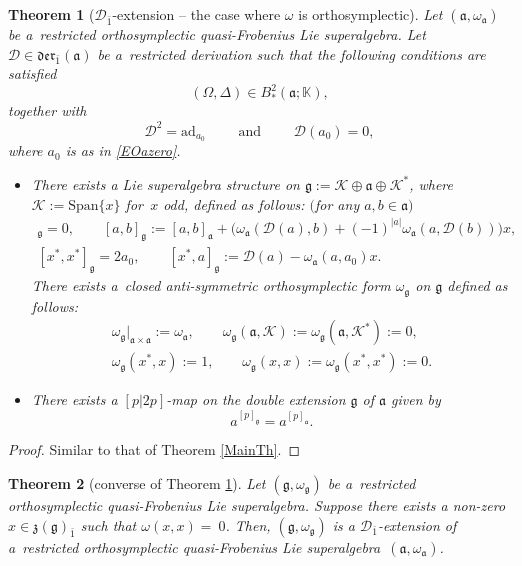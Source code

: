 \documentclass[10pt,a4paper]{amsart}
\numberwithin{equation}{section}
\newtheorem{Theorem}{Theorem}[section]
\begin{document}
\begin{Theorem}[${\mathscr D}_{\bar 1}$-extension -- the case where $\omega$ is orthosymplectic] \label{MainThO}
Let $(\mathfrak{a}, \omega_\mathfrak{a})$ be a~restricted orthosymplectic quasi-Frobenius Lie superalgebra. Let ${\mathscr D}\in \mathfrak{der}_{\bar 1}(\mathfrak{a})$ be a~restricted derivation such that the following conditions are satisfied
\[
(\Omega,\Delta) \in B^2_*(\mathfrak{a}; \mathbb{K}),
\]
together with
\[
{\mathscr D}^2=\mathrm{ad}_{a_0} \qquad \text{ and }\qquad {\mathscr D}(a_0)=0,
\]
where $a_0$ is as in \eqref{EOazero}.
\begin{itemize}
\item[$(i)$] There exists a Lie superalgebra structure on $\mathfrak{g}:=\mathscr{K} \oplus \mathfrak{a} \oplus \mathscr{K} ^*$, where $\mathscr{K} :=\mathrm{Span}\{x\}$ for~$x$ odd, defined as follows: $($for any $a, b\in \mathfrak{a})$
\begin{gather*}
[\mathscr{K} ,\mathfrak{g}]_\mathfrak{g}=0, \qquad [a,b]_\mathfrak{g} := [a,b]_\mathfrak{a} + \bigl(\omega_\mathfrak{a}( {\mathscr D}(a), b) +(-1)^{|a|} \omega_\mathfrak{a}(a, {\mathscr D}(b))\bigr)x, \\
[x^*, x^*]_\mathfrak{g}=2 a_0, \qquad [x^*,a]_\mathfrak{g} := {\mathscr D}(a) - \omega_\mathfrak{a}(a,a_0)x.
\end{gather*}
There exists a~closed anti-symmetric orthosymplectic form $\omega_\mathfrak{g}$ on $\mathfrak{g}$ defined as follows:
\begin{gather*}
{\omega_\mathfrak{g}}\vert_{\mathfrak{a} \times \mathfrak{a}}:= \omega_\mathfrak{a}, \qquad \omega_\mathfrak{g}(\mathfrak{a},\mathscr{K} ):=\omega_\mathfrak{g}(\mathfrak{a},\mathscr{K} ^*):=0, \\ \omega_\mathfrak{g}(x^*,x):=1, \qquad
\omega_\mathfrak{g}(x,x):=\omega_\mathfrak{g}(x^*,x^*) :=0.
\end{gather*}
\item[$(ii)$] There exists a $[p|2p]$-map on the double extension $\mathfrak{g}$ of $\mathfrak{a}$ given by
\[
a^{[p]_\mathfrak{g}} = a^{[p]_\mathfrak{a}}.
\]
\end{itemize}
\end{Theorem}
\begin{proof}
 Similar to that of Theorem \ref{MainTh}.
\end{proof}
\begin{Theorem}[converse of Theorem \ref{MainThO}]\label{Rec2}
Let $(\mathfrak{g},\omega_\mathfrak{g})$ be a~restricted orthosymplectic quasi-Frobenius Lie superalgebra. Suppose there exists a non-zero $x \in \mathfrak{z}(\mathfrak{g})_{\bar 1}$ such that $\omega(x,x)=~0$. Then, $(\mathfrak{g},\omega_\mathfrak{g})$ is a ${\mathscr D}_{\bar 1}$-extension of a~restricted orthosymplectic quasi-Frobenius Lie superalgebra~$(\mathfrak{a},\omega_\mathfrak{a})$.
\end{Theorem}
\end{document}
